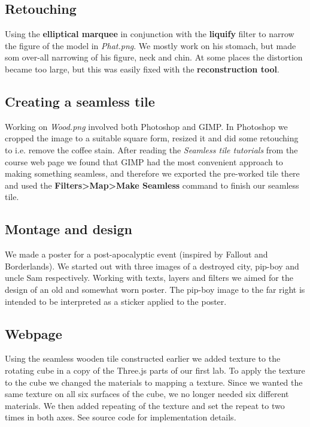 \documentclass[a4paper]{article}
\begin{document}
\subsection{Retouching} %
Using the \textbf{elliptical marquee} in conjunction with the \textbf{liquify}
filter to narrow the figure of the model in \textit{Phat.png}. We mostly work on
his stomach, but made som over-all narrowing of his figure, neck and chin. At
some places the distortion became too large, but this was easily fixed with the
\textbf{reconstruction tool}.

\subsection{Creating a seamless tile} %
Working on \textit{Wood.png} involved both Photoshop and GIMP. In Photoshop we
cropped the image to a suitable square form, resized it and did some retouching
to i.e. remove the coffee stain. After reading the \textit{Seamless tile
tutorials} from the course web page we found that GIMP had the most convenient
approach to making something seamless, and therefore we exported the pre-worked
tile there and used the \textbf{Filters>Map>Make Seamless} command to finish our
seamless tile.

\subsection{Montage and design} %
We made a poster for a post-apocalyptic event (inspired by Fallout and
Borderlands). We started out with three images of a destroyed city, pip-boy and
uncle Sam respectively. Working with texts, layers and filters we aimed for the
design of an old and somewhat worn poster. The pip-boy image to the far right is
intended to be interpreted as a sticker applied to the poster.

\subsection{Webpage} %
Using the seamless wooden tile constructed earlier we added texture to the
rotating cube in a copy of the Three.js parts of our first lab. To apply the
texture to the cube we changed the materials to mapping a texture. Since we
wanted the same texture on all six surfaces of the cube, we no longer needed six
different materials. We then added repeating of the texture and set the repeat
to two times in both axes. See source code for implementation details.
\end{document}
